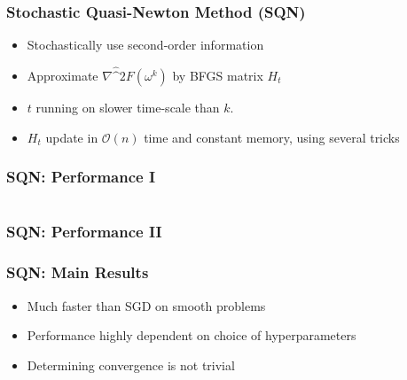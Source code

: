 \documentclass[10pt]{beamer}
\begin{document}
  \begin{frame}\frametitle{Stochastic Quasi-Newton Method (SQN)}
      \begin{itemize}
        \item \alert{Stochastically} use second-order information
        \item Approximate $\nabla \hat^2 F(\omega^{k})$ by BFGS matrix $H_t$
        \item $t$ running on slower time-scale than $k$. 
        \item $H_t$ update in $\mathcal O(n)$ time and constant memory, using several tricks
      \end{itemize}
  \end{frame}


  \begin{frame}
    \frametitle{SQN: Performance I}

      \begin{columns}[T]
      \begin{column}{.5\textwidth}
        \resizebox{\linewidth}{!}{}
      \end{column}\hfill
      \begin{column}{.5\textwidth}
        \resizebox{\linewidth}{!}{}
      \end{column}
    \end{columns}
  \end{frame}

  \begin{frame}
    \frametitle{SQN: Performance II}
    \center{\resizebox{0.8\linewidth}{!}{}}
  \end{frame}

  \begin{frame}\frametitle{SQN: Main Results}
    \begin{itemize}
      \item Much faster than SGD on smooth problems
      \item Performance highly dependent on choice of hyperparameters
      \item Determining convergence is not trivial
    \end{itemize}
  
  \end{frame}
\end{document}
